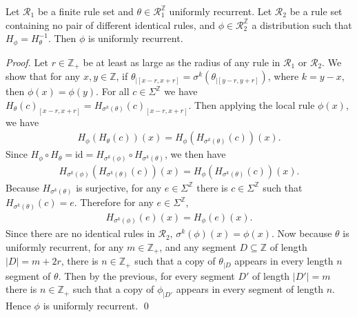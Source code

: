 \documentclass[10pt,a4paper]{amsart}
\newcommand{\R}{\mathcal{R}}
\newcommand{\Z}{\mathbb{Z}}
\newcommand{\id}{\mathrm{id}}
\begin{document}
\begin{theorem} \label{unif_revers_unif}
Let $\R_1$ be a finite rule set and $\theta \in \R_1^\Z$ uniformly recurrent. Let $\R_2$ be a rule set containing no pair of different identical rules, and $\phi \in \R_2^\Z$ a distribution such that $H_\phi = H_\theta^{-1}$. Then $\phi$ is uniformly recurrent.
\end{theorem}

\begin{proof} 
Let $r\in \Z_+$ be at least as large as the radius of any rule in $\R_1$ or $\R_2$. We show that for any $x,y \in \Z$, if $\theta_{|[x-r,x+r]} = \sigma^k (\theta_{|[y-r,y+r]})$, where $k=y-x$, then $\phi(x) = \phi(y)$. For all $c \in \Sigma^\Z$ we have $H_\theta (c)_{[x-r,x+r]} = H_{\sigma^k (\theta)} (c)_{[x-r,x+r]}$. Then applying the local rule $\phi(x)$, we have
\begin{align*}
H_\phi (H_\theta (c)) (x) = H_\phi (H_{\sigma^k (\theta)} (c)) (x).
\end{align*}
Since $H_\phi \circ H_\theta = \id = H_{\sigma^k (\phi)} \circ H_{\sigma^k (\theta)}$, we then have
\begin{align*}
H_{\sigma^k(\phi)} (H_{\sigma^k (\theta)} (c)) (x) = H_\phi (H_{\sigma^k (\theta)} (c)) (x).
\end{align*}
Because $H_{\sigma^k (\theta)}$ is surjective, for any $e \in \Sigma^\Z$ there is $c \in \Sigma^\Z$ such that $H_{\sigma^k (\theta)}(c) = e$. Therefore for any $e\in \Sigma^\Z$, 
\begin{align*}
H_{\sigma^k(\phi)} (e) (x) = H_\phi (e) (x).
\end{align*}
Since there are no identical rules in $\R_2$, $\sigma^k(\phi)(x) = \phi(x)$. Now because $\theta$ is uniformly recurrent, for any $m \in \Z_+$, and any segment $D \subseteq \Z$ of length $|D|=m+2r$, there is $n \in \Z_+$ such that  a copy of $\theta_{|D}$ appears in every length $n$ segment of $\theta$. Then by the previous, for every segment $D'$ of length $|D'|=m$ there is $n\in \Z_+$ such that a copy of $\phi_{|D'}$ appears in every segment of length $n$. Hence $\phi$ is uniformly recurrent.
\qed





\end{proof}
\end{document}

